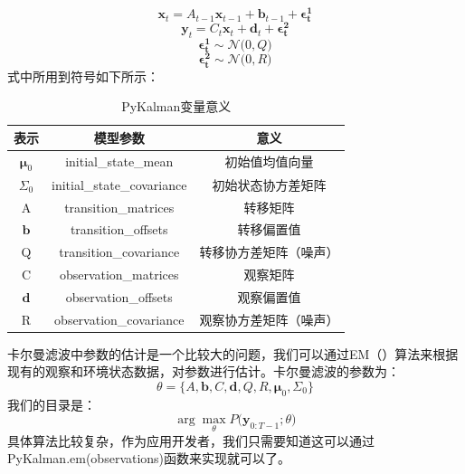 \documentclass{article}
\begin{document}
\begin{equation}
\boldsymbol{x}_{t} = A_{t-1}\boldsymbol{x}_{t-1} + \boldsymbol{b}_{t-1} + \boldsymbol{\epsilon _{t}^{1}}
\label{e000071}
\end{equation}
\begin{equation}
\boldsymbol{y}_{t} = C_{t}\boldsymbol{x}_{t} + \boldsymbol{d}_{t} + \boldsymbol{\epsilon _{t}^{2}}
\label{e000072}
\end{equation}
\begin{equation}
\boldsymbol{\epsilon _{t}^{1}} \sim \mathcal{N} \big( 0, Q \big)
\label{e000073}
\end{equation}
\begin{equation}
\boldsymbol{\epsilon _{t}^{2}} \sim \mathcal{N} \big( 0, R \big)
\label{e000074}
\end{equation}
式中所用到符号如下所示：
\begin{table}[h]
\caption{PyKalman变量意义}
\label{t000002}
\begin{tabular}{|c|c|c|} \hline
表示 & 模型参数 & 意义 \\ \hline  
$\boldsymbol{\mu} _ {0}$ & initial\_state\_mean & 初始值均值向量 \\ \hline
$\Sigma _{0}$ & initial\_state\_covariance & 初始状态协方差矩阵 \\ \hline
A & transition\_matrices & 转移矩阵 \\ \hline
$\boldsymbol{b}$ & transition\_offsets &  转移偏置值 \\ \hline
Q & transition\_covariance & 转移协方差矩阵（噪声） \\ \hline
C & observation\_matrices & 观察矩阵 \\ \hline
$\boldsymbol{d}$ & observation\_offsets & 观察偏置值 \\ \hline
R & observation\_covariance & 观察协方差矩阵（噪声） \\ \hline
\end{tabular}
\end{table}
卡尔曼滤波中参数的估计是一个比较大的问题，我们可以通过EM（）算法来根据现有的观察和环境状态数据，对参数进行估计。卡尔曼滤波的参数为：
\begin{equation}
\theta = \{A, \boldsymbol{b}, C, \boldsymbol{d}, Q, R, \boldsymbol{\mu}_{0}, \Sigma _{0}\}
\label{e000075}
\end{equation}
我们的目录是：
\begin{equation}
\arg \max _{\theta} P \big( \boldsymbol{y}_{0:T-1};\theta \big)
\label{e000076}
\end{equation}
具体算法比较复杂，作为应用开发者，我们只需要知道这可以通过PyKalman.em(observations)函数来实现就可以了。\newline
\end{document}
